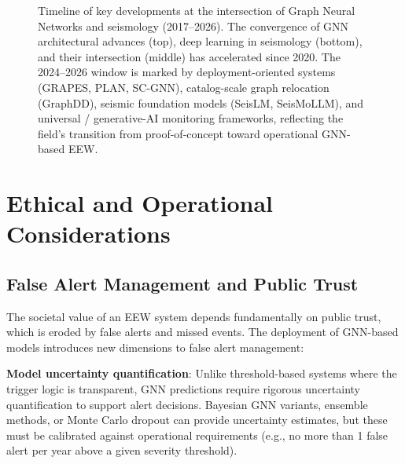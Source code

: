 \documentclass[review,authoryear]{elsarticle}
\begin{document}
\begin{figure}[htbp]
\caption{Timeline of key developments at the intersection of Graph Neural Networks and seismology (2017--2026). The convergence of GNN architectural advances (top), deep learning in seismology (bottom), and their intersection (middle) has accelerated since 2020. The 2024--2026 window is marked by deployment-oriented systems (GRAPES, PLAN, SC-GNN), catalog-scale graph relocation (GraphDD), seismic foundation models (SeisLM, SeisMoLLM), and universal / generative-AI monitoring frameworks, reflecting the field's transition from proof-of-concept toward operational GNN-based EEW.}
\label{fig:timeline}
\end{figure}


\section{Ethical and Operational Considerations}
\label{sec:ethical}

\subsection{False Alert Management and Public Trust}

The societal value of an EEW system depends fundamentally on public trust, which is eroded by false alerts and missed events. The deployment of GNN-based models introduces new dimensions to false alert management:

\textbf{Model uncertainty quantification}: Unlike threshold-based systems where the trigger logic is transparent, GNN predictions require rigorous uncertainty quantification to support alert decisions. Bayesian GNN variants, ensemble methods, or Monte Carlo dropout can provide uncertainty estimates, but these must be calibrated against operational requirements (e.g., no more than 1 false alert per year above a given severity threshold).
\end{document}
